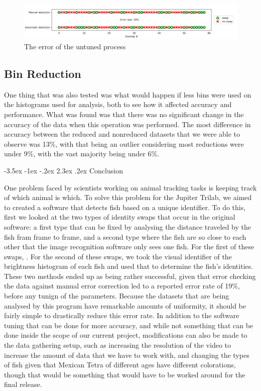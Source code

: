 \documentclass{article}
\makeatletter
\renewcommand\section{\clearpage\newpage\@startsection {section}{1}{\z@}%
	{-3.5ex \@plus -1ex \@minus -.2ex}%
	{2.3ex \@plus.2ex}%
	{\normalfont\Large\bfseries}}
\makeatother
\begin{document}
\begin{figure}[H]
	\centering
	\includegraphics[width=\linewidth]{error}
	\caption{The error of the untuned process}
\end{figure}

\subsection{Bin Reduction}
\label{sec:binReduce}

One thing that was also tested was what would happen if less bins were used on the histograms used for analysis, both to see how it affected accuracy and performance. What was found was that there was no significant change in the accuracy of the data when this operation was performed. The most difference in accuracy between the reduced and nonreduced datasets that we were able to observe was 13\%, with that being an outlier considering most reductions were under 9\%, with the vast majority being under 6\%. 


\section{Conclusion}

One problem faced by scientists working on animal tracking tasks is keeping track of which animal is which. To solve this problem for the Jupiter Trilab, we aimed to created a software that detects fish based on a unique identifier. To do this, first we looked at the two types of identity swaps that occur in the original software: a first type that can be fixed by analysing the distance traveled by the fish fram frame to frame, and a second type where the fish are so close to each other that the image recognition software only sees one fish. For the first of these swaps, . For the second of these swaps, we took the visual identifier of the brightness histogram of each fish and used that to determine the fish's identities. These two methods ended up as being rather successful, given that error checking the data against manual error correction led to a reported error rate of 19\%, before any tunign of the parameters. Because the datasets that are being analysed by this program have remarkable amounts of uniformity, it should be fairly simple to drastically reduce this error rate. In addition to the software tuning that can be done for more accuracy, and while not something that can be done inside the scope of our current project, modifications can also be made to the data gathering setup, such as increasing the resolution of the video to increase the amount of data that we have to work with, and changing the types of fish given that Mexican Tetra of different ages have different colorations, though that would be something that would have to be worked around for the final release.
\end{document}
